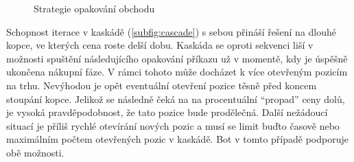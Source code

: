 \begin{figure}[ht]
    \centering
    \qquad
    
    \qquad
    \caption{Strategie opakování obchodu}
    \label{fig:trade-repeat}
\end{figure}

Schopnost iterace v kaskádě (\ref{subfig:cascade}) s sebou přináší řešení na dlouhé kopce, ve kterých cena roste delší dobu. Kaskáda se oproti sekvenci liší v možnosti spuštění následujícího opakování příkazu
už v momentě, kdy je úspěšně ukončena nákupní fáze. V rámci tohoto může docházet k více otevřeným pozicím na trhu. Nevýhodou je opět eventuální otevření pozice těsně před koncem stoupání
kopce. Jelikož se následně čeká na na procentuální \enquote{propad} ceny dolů, je vysoká pravděpodobnost, že tato pozice bude prodělečná. Další nežádoucí situací je příliš rychlé otevírání
nových pozic a musí se limit buďto časově nebo maximálním počtem otevřených pozic v kaskádě. Bot v tomto případě podporuje obě možnosti.

